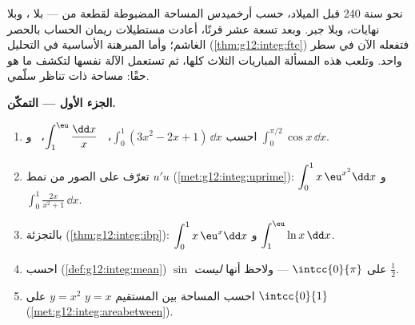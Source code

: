 \begin{problem}
\label{pb:g12:integ:1}
نحو سنة 240 قبل الميلاد، حسب أرخميدس المساحة المضبوطة لقطعة
من  --- بلا ، وبلا نهايات، وبلا جبر.
وبعد تسعة عشر قرنًا، أعادت مستطيلات ريمان الحساب بالحصر
الغاشم؛ وأما المبرهنة الأساسية في التحليل
(\cref{thm:g12:integ:ftc}) فتفعله الآن في سطر واحد. وتلعب هذه المسألة
المباريات الثلاث كلها، ثم تستعمل الآلة نفسها لتكشف
ما هو  حقًا: مساحة ذات تناظر سلّمي.

\medskip
\noindent\textbf{الجزء الأول --- التمكّن.}
\begin{enumerate}
  \item احسب $\displaystyle\int_0^1 (3x^2 - 2x + 1)\,\dd x$،
        \ $\displaystyle\int_1^{\eu} \frac{\dd x}{x}$، \ و
        $\displaystyle\int_0^{\pi/2} \cos x\,\dd x$.
  \item تعرّف على الصور من نمط $u'u$
        (\cref{met:g12:integ:uprime}):
        $\displaystyle\int_0^1 x\,\eu^{x^2}\dd x$ و
        $\displaystyle\int_0^1 \frac{2x}{x^2 + 1}\,\dd x$.
  \item بالتجزئة (\cref{thm:g12:integ:ibp}):
        $\displaystyle\int_0^1 x\,\eu^x \dd x$ و
        $\displaystyle\int_1^{\eu} \ln x\,\dd x$.
  \item احسب 
        (\cref{def:g12:integ:mean})  $\sin$ على
        $\intcc{0}{\pi}$ --- ولاحظ أنها \emph{ليست}
        $\frac12$.
  \item احسب المساحة بين المستقيم $y = x$  $y = x^2$ على $\intcc{0}{1}$
        (\cref{met:g12:integ:areabetween}).
\end{enumerate}


\end{problem}
